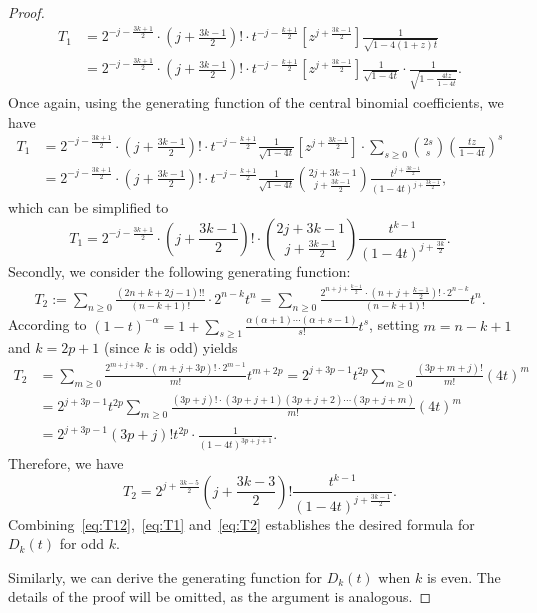\documentclass[reqno, 12pt]{article}
\theoremstyle{mydefinition}
\theoremstyle{myremark}
\numberwithin{algorithm}{section}
\begin{document}
\begin{proof}
\begin{align*}
T_1 &= 2^{-j-\frac{3k+1}{2}}\cdot \left(j+\frac{3k-1}{2}\right)! \cdot t^{-j-\frac{k+1}{2}}[z^{j+\frac{3k-1}{2}}]\frac{1}{\sqrt{1-4(1+z)t}}
\\ &=2^{-j-\frac{3k+1}{2}}\cdot \left(j+\frac{3k-1}{2}\right)! \cdot t^{-j-\frac{k+1}{2}}[z^{j+\frac{3k-1}{2}}] \frac{1}{\sqrt{1-4t}} \cdot \frac{1}{\sqrt{1-\frac{4tz}{1-4t}}}.
\end{align*}
Once again, using the generating function of the central binomial coefficients, we have
\begin{align*}
T_1 &=2^{-j-\frac{3k+1}{2}}\cdot \left(j+\frac{3k-1}{2}\right)! \cdot t^{-j-\frac{k+1}{2}}\frac{1}{\sqrt{1-4t}} [z^{j+\frac{3k-1}{2}}] \cdot \sum_{s\geq 0}\binom{2s}{s}\left(\frac{tz}{1-4t}\right)^s
\\ &=2^{-j-\frac{3k+1}{2}}\cdot \left(j+\frac{3k-1}{2}\right)! \cdot t^{-j-\frac{k+1}{2}}\frac{1}{\sqrt{1-4t}} \binom{2j+3k-1}{j+\frac{3k-1}{2}} \frac{t^{j+\frac{3k-1}{2}}}{(1-4t)^{j+\frac{3k-1}{2}}},
\end{align*}
which can be simplified to
\begin{equation}\label{eq:T1}
T_1=2^{-j-\frac{3k+1}{2}}\cdot \left(j+\frac{3k-1}{2}\right)! \cdot \binom{2j+3k-1}{j+\frac{3k-1}{2}} \frac{t^{k-1}}{(1-4t)^{j+\frac{3k}{2}}}.
\end{equation}
Secondly, we consider the following generating function:
\begin{align*}
T_2:=\sum_{n\geq 0} \frac{(2n+k+2j-1)!!}{(n-k+1)!}\cdot 2^{n-k} t^n
=\sum_{n\geq 0} \frac{2^{n+j+\frac{k-1}{2}}\cdot (n+j+\frac{k-1}{2})!\cdot 2^{n-k}}{(n-k+1)!} t^n.
\end{align*}
According to $(1-t)^{-\alpha}=1+\sum_{s\geq 1} \frac{\alpha (\alpha +1)\cdots (\alpha +s-1)}{s!}t^s$,
setting $m=n-k+1$ and $k=2p+1$ (since $k$ is odd) yields
\begin{align*}
T_2 &=\sum_{m\geq 0} \frac{2^{m+j+3p}\cdot (m+j+3p)!\cdot 2^{m-1}}{m!} t^{m+2p}
=2^{j+3p-1}t^{2p} \sum_{m\geq 0} \frac{(3p+m+j)!}{m!} (4t)^{m}
\\ &= 2^{j+3p-1}t^{2p} \sum_{m\geq 0} \frac{(3p+j)!\cdot (3p+j+1)(3p+j+2)\cdots (3p+j+m)}{m!} (4t)^{m}
\\ &= 2^{j+3p-1}(3p+j)! t^{2p}\cdot \frac{1}{(1-4t)^{3p+j+1}}.
\end{align*}
Therefore, we have
\begin{equation}\label{eq:T2}
T_2= 2^{j+\frac{3k-5}{2}}\left(j+\frac{3k-3}{2}\right)! \frac{t^{k-1}}{(1-4t)^{j+\frac{3k-1}{2}}}.
\end{equation}
Combining~\eqref{eq:T12},~\eqref{eq:T1} and~\eqref{eq:T2} establishes the desired formula for $D_k(t)$ for odd $k$.

Similarly, we can derive the  generating function for $D_k(t)$ when $k$ is even. The details of the proof will be omitted, as the argument is analogous.
\end{proof}
\end{document}
